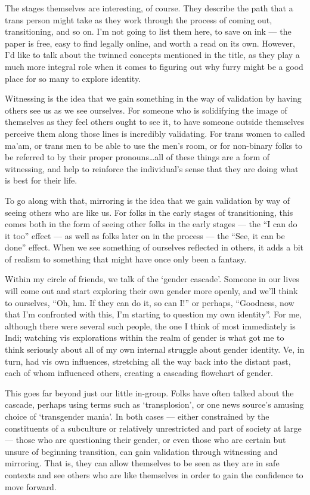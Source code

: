 The stages themselves are interesting, of course. They describe the path that a trans person might take as they work through the process of coming out, transitioning, and so on. I'm not going to list them here, to save on ink --- the paper is free, easy to find legally online, and worth a read on its own. However, I'd like to talk about the twinned concepts mentioned in the title, as they play a much more integral role when it comes to figuring out why furry might be a good place for so many to explore identity.

Witnessing is the idea that we gain something in the way of validation by having others see us as we see ourselves. For someone who is solidifying the image of themselves as they feel others ought to see it, to have someone outside themselves perceive them along those lines is incredibly validating. For trans women to called ma'am, or trans men to be able to use the men's room, or for non-binary folks to be referred to by their proper pronouns\ldots{}all of these things are a form of witnessing, and help to reinforce the individual's sense that they are doing what is best for their life.

To go along with that, mirroring is the idea that we gain validation by way of seeing others who are like us. For folks in the early stages of transitioning, this comes both in the form of seeing other folks in the early stages --- the ``I can do it too'' effect --- as well as folks later on in the process --- the ``See, it can be done'' effect. When we see something of ourselves reflected in others, it adds a bit of realism to something that might have once only been a fantasy.

Within my circle of friends, we talk of the `gender cascade'. Someone in our lives will come out and start exploring their own gender more openly, and we'll think to ourselves, ``Oh, hm. If they can do it, so can I!'' or perhaps, ``Goodness, now that I'm confronted with this, I'm starting to question my own identity''. For me, although there were several such people, the one I think of most immediately is Indi; watching vis explorations within the realm of gender is what got me to think seriously about all of my own internal struggle about gender identity. Ve, in turn, had vis own influences, stretching all the way back into the distant past, each of whom influenced others, creating a cascading flowchart of gender.

This goes far beyond just our little in-group. Folks have often talked about the cascade, perhaps using terms such as `transplosion', or one news source's amusing choice of `transgender mania'. In both cases --- either constrained by the constituents of a subculture or relatively unrestricted and part of society at large --- those who are questioning their gender, or even those who are certain but unsure of beginning transition, can gain validation through witnessing and mirroring. That is, they can allow themselves to be seen as they are in safe contexts and see others who are like themselves in order to gain the confidence to move forward.

